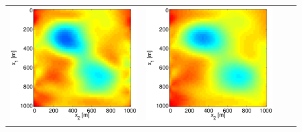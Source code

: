 \documentclass{iopart}
\begin{document}
\begin{figure}
\begin{tabular}{cccc}
\includegraphics[scale=.2]{./figs/2D_exp3_e}&
\includegraphics[scale=.2]{./figs/2D_exp3_f}&

\end{tabular}
\end{figure}
\end{document}
